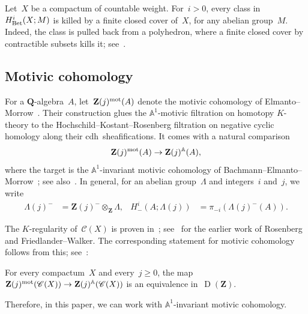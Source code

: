 \documentclass[11pt,a4paper]{amsart}
\numberwithin{equation}{section}
\theoremstyle{plain}
\theoremstyle{definition}
\theoremstyle{remark}
\newcommand{\ZZ}{\mathbf{Z}}
\newcommand{\QQ}{\mathbf{Q}}
\newcommand{\AA}{\mathbb{A}}
\newcommand{\mot}{\textnormal{mot}}
\newcommand{\Bet}{\textnormal{Bet}}
\newcommand{\D}{\operatorname{D}}
\newcommand{\X}{\mathord{-}}
\newcommand{\Cls}[1]{\mathscr{#1}}
\begin{document}
\begin{example}\label{x557y5}
  Let~\(X\) be a compactum of countable weight.
  For~\(i>0\),
  every class in~\(H^i_{\Bet}(X;M)\)
  is killed by a finite closed cover of~\(X\),
  for any abelian group~\(M\).
  Indeed,
  the class is pulled back from a polyhedron,
  where a finite closed
  cover by contractible subsets kills it;
  see~\cite[Proposition~1.7]{k-ros-1}.
\end{example}

\subsection{Motivic cohomology}\label{ss:motivic}

For a \(\QQ\)-algebra~\(A\), let~\(\ZZ(j)^{\mot}(A)\)
denote the motivic cohomology of
Elmanto–Morrow~\cite{ElmantoMorrow}. Their construction glues the
\(\AA^1\)-motivic filtration on homotopy \(K\)-theory to the
Hochschild–Kostant–Rosenberg filtration on negative cyclic homology
along their cdh~sheafifications.
It comes with a natural comparison
\begin{equation*}
  \ZZ(j)^{\mot}(A)\to\ZZ(j)^{\AA}(A),
\end{equation*}
where the target is the \(\AA^1\)-invariant motivic cohomology of
Bachmann–Elmanto–Morrow~\cite{BachmannElmantoMorrow}; see
also~\cite[Sections~1.1–2]{ElmantoMorrow}.
In general,
for an abelian group~\(\Lambda\) and integers~\(i\) and~\(j\),
we write
\begin{align*}
  \Lambda(j)^{\X}&=\ZZ(j)^{\X}\otimes_{\ZZ}\Lambda,&
  H^i_{\X}(A;\Lambda(j))&=\pi_{-i}(\Lambda(j)^{\X}(A)).
\end{align*}

The \(K\)-regularity of~\(\Cls{C}(X)\)
is proven in~\cite[Theorem~1.5]{CortinasThom12};
see~\cite[Remark~8.2]{CortinasThom12}
for the earlier work of Rosenberg and Friedlander–Walker.
The corresponding statement for motivic cohomology follows from this;
see~\cite[Theorem~6.1]{Bouis26}:

\begin{theorem}[Bouis]\label{bouis}
  For every compactum~\(X\) and every~\(j\geq0\),
  the map
  \(\ZZ(j)^{\mot}(\Cls{C}(X))\to\ZZ(j)^{\AA}(\Cls{C}(X))\)
  is an equivalence in~\(\D(\ZZ)\).
\end{theorem}

Therefore,
in this paper, we can work with \(\AA^1\)-invariant motivic cohomology.
\end{document}
